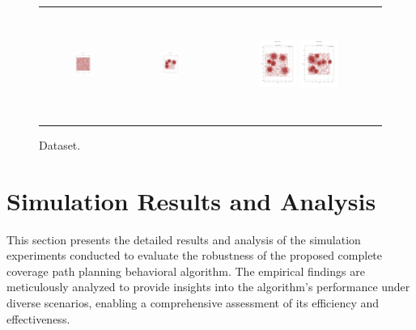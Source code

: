 \begin{figure}[p]
\begin{tabular}{ccc}
        \includegraphics[height=36mm,width=0.24\textwidth]{Images/data/51.png}
        & \includegraphics[height=36mm,width=0.24\textwidth]{Images/data/52.png}
        & \includegraphics[height=36mm,width=0.24\textwidth]{Images/data/53.png}
        \includegraphics[height=36mm,width=0.24\textwidth]{Images/data/54.png}\\[-4pt]
        
    \end{tabular}
    \caption{Dataset.\label{fig:Dataset}}
\end{figure}


\section{Simulation Results and Analysis}

This section presents the detailed results and analysis of the simulation experiments conducted to evaluate the robustness of the proposed complete coverage path planning behavioral algorithm. The empirical findings are meticulously analyzed to provide insights into the algorithm's performance under diverse scenarios, enabling a comprehensive assessment of its efficiency and effectiveness. 

